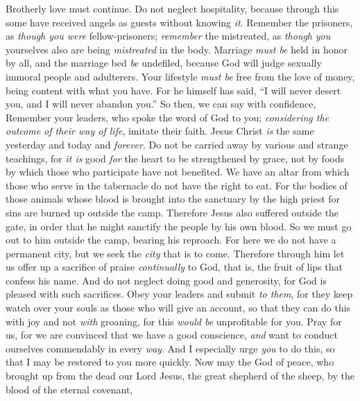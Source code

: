 \begin{biblechapter} %
 Brotherly love must continue.
\verse Do not neglect hospitality, because through this some have received angels as guests without knowing \textit{it}.
\verse Remember the prisoners, as \textit{though you were} fellow-prisoners; \textit{remember} the mistreated, as \textit{though} \textit{you} yourselves also are being \textit{mistreated} in the body.
\verse Marriage \textit{must be} held in honor by all, and the marriage bed \textit{be} undefiled, because God will judge sexually immoral people and adulterers.
\verse Your lifestyle \textit{must be} free from the love of money, being content with what you have. For he himself has said, “I will never desert you, and I will never abandon you.”
\verse So then, we can say with confidence,
\verse Remember your leaders, who spoke the word of God to you; \textit{considering the outcome of their way of life}, imitate their faith.
\verse Jesus Christ \textit{is} the same yesterday and today and \textit{forever}.
\verse Do not be carried away by various and strange teachings, for \textit{it is} good \textit{for} the heart to be strengthened by grace, not by foods by which those who participate have not benefited.
\verse We have an altar from which those who serve in the tabernacle do not have the right to eat.
\verse For the bodies of those animals whose blood is brought into the sanctuary by the high priest for sins are burned up outside the camp.
\verse Therefore Jesus also suffered outside the gate, in order that he might sanctify the people by his own blood.
\verse So we must go out to him outside the camp, bearing his reproach.
\verse For here we do not have a permanent city, but we seek the \textit{city} that is to come.
\verse Therefore through him let us offer up a sacrifice of praise \textit{continually} to God, that is, the fruit of lips that confess his name.
\verse And do not neglect doing good and generosity, for God is pleased with such sacrifices.
\verse Obey your leaders and submit \textit{to them}, for they keep watch over your souls as those who will give an account, so that they can do this with joy and not \textit{with} groaning, for this \textit{would be} unprofitable for you.
\verse Pray for us, for we are convinced that we have a good conscience, \textit{and} want to conduct ourselves commendably in every \textit{way}.
\verse And I especially urge \textit{you} to do this, so that I may be restored to you more quickly.
 Now may the God of peace, who brought up from the dead our Lord Jesus, the great shepherd of the sheep, by the blood of the eternal covenant,

\end{biblechapter}
